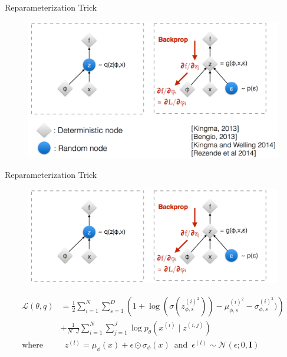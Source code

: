 \documentclass{beamer}
\begin{document}
\begin{frame}{Reparameterization Trick}
\begin{figure}
    \centering
    \includegraphics[width=0.9\columnwidth]{exp/reparam-pic.png}
\end{figure}
\end{frame}
\begin{frame}{Reparameterization Trick}
\begin{figure}
    \centering
    \includegraphics[width=0.9\columnwidth]{exp/reparam-pic-2.png}
\end{figure}
\begin{align*}
 \mathcal{L}(\theta,q)
&=\frac{1}{2} \sum_{i=1}^N \sum_{s=1}^D
 \left(1+\log(\sigma(z_{\phi,s}^{{(i)}^2}))
 -\mu_{\phi,s}^{{(i)}^2}
 -\sigma_{\phi,s}^{{(i)}^2})\right)\\
&+\frac{1}{N\cdot J} \sum_{i=1}^N \sum_{j=1}^J
 \log p_{\theta}(x^{(i)} \mid z^{(i,j)})\\
 \text{where}
&\,\,\, z^{(l)} = \mu_{\phi}(x) + \epsilon \odot \sigma_{\phi}(x) \,\,\,\text{and}\,\,\, \epsilon^{(l)} \sim \mathcal{N}(\epsilon; 0, \mathbf{I})
\end{align*}
\end{frame}
\end{document}

